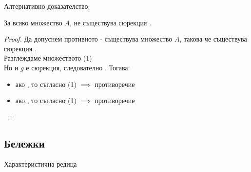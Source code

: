 Алтернативно доказателство:
\begin{theorem}
    За всяко множество \(A\), не съществува сюрекция .
\end{theorem}
\begin{proof}
    Да допуснем противното - съществува множество \(A\), такова че съществува сюрекция . \\
    Разглеждаме множеството  (1) \\
    Но  и \(g\) е сюрекция, следователно .
    Тогава:
    \begin{itemize}
        \item ако , то  съгласно (1) \(\implies\) противоречие
        \item ако , то  съгласно (1) \(\implies\) противоречие
    \end{itemize}
\end{proof}

\subsection{Бележки}
\begin{definition}
\end{definition}

\begin{definition}
    Характеристична редица
\end{definition}